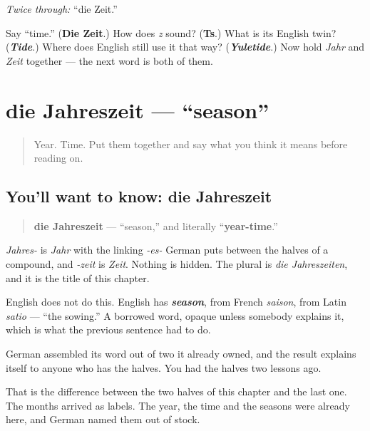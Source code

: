\emph{Twice through:} \textquotedblleft{}die Zeit.\textquotedblright{}

\begin{tcolorbox}[breakable,colback=teal!4,colframe=teal!35!black,title={Before you move on}]
Say \textquotedblleft{}time.\textquotedblright{} (\textbf{Die Zeit}.) How does \emph{z} sound? (\textbf{Ts}.) What is its English twin? (\emph{\textbf{Tide}}.) Where does English still use it that way? (\emph{\textbf{Yuletide}}.) Now hold \emph{Jahr} and \emph{Zeit} together — the next word is both of them.
\end{tcolorbox}
\section[die Jahreszeit]{die Jahreszeit — \textquotedblleft{}season\textquotedblright{}}

\label{lesson:GE-C09-jahreszeit}



\begin{quote}
Year. Time. Put them together and say what you think it means before reading on.
\end{quote}

\subsection*{You'll want to know: die Jahreszeit}
\begin{quote}
\textbf{die Jahreszeit} — \textquotedblleft{}season,\textquotedblright{} and literally \textquotedblleft{}\textbf{year-time}.\textquotedblright{}
\end{quote}

\emph{Jahres-} is \emph{Jahr} with the linking \emph{-es-} German puts between the halves of a compound, and \emph{-zeit} is \emph{Zeit}. Nothing is hidden. The plural is \emph{die Jahreszeiten}, and it is the title of this chapter.

\begin{culture}
English does not do this. English has \emph{\textbf{season}}, from French \emph{saison}, from Latin \emph{satio} — \textquotedblleft{}the sowing.\textquotedblright{} A borrowed word, opaque unless somebody explains it, which is what the previous sentence had to do.

German assembled its word out of two it already owned, and the result explains itself to anyone who has the halves. You had the halves two lessons ago.

That is the difference between the two halves of this chapter and the last one. The months arrived as labels. The year, the time and the seasons were already here, and German named them out of stock.
\end{culture}

